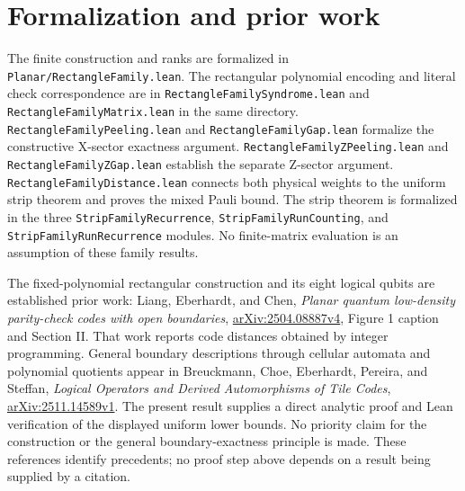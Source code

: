 \documentclass{article}
\begin{document}
\section{Formalization and prior work}\label{sec:prior-work}
\begingroup\sloppy
The finite construction and ranks are formalized in
\texttt{Planar/RectangleFamily.lean}. The rectangular polynomial encoding
and literal check correspondence are in
\texttt{RectangleFamilySyndrome.lean} and
\texttt{RectangleFamilyMatrix.lean} in the same directory.
\texttt{RectangleFamilyPeeling.lean} and
\texttt{RectangleFamilyGap.lean} formalize the constructive X-sector
exactness argument. \texttt{RectangleFamilyZPeeling.lean} and
\texttt{RectangleFamilyZGap.lean} establish the separate Z-sector argument.
\texttt{RectangleFamilyDistance.lean} connects both physical weights to
the uniform strip theorem and proves the mixed Pauli bound.
The strip theorem is formalized in the three
\texttt{StripFamilyRecurrence}, \texttt{StripFamilyRunCounting}, and
\texttt{StripFamilyRunRecurrence} modules. No finite-matrix evaluation is
an assumption of these family results.

The fixed-polynomial rectangular construction and its eight logical qubits
are established prior work: Liang, Eberhardt, and Chen,
\emph{Planar quantum low-density parity-check codes with open boundaries},
\href{https://arxiv.org/html/2504.08887v4}{arXiv:2504.08887v4},
Figure 1 caption and Section II. That work reports code distances obtained
by integer programming. General boundary descriptions through cellular
automata and polynomial quotients appear in Breuckmann, Choe, Eberhardt,
Pereira, and Steffan,
\emph{Logical Operators and Derived Automorphisms of Tile Codes},
\href{https://arxiv.org/html/2511.14589v1}{arXiv:2511.14589v1}.
The present result supplies a direct analytic proof and Lean verification
of the displayed uniform lower bounds. No priority claim for the
construction or the general boundary-exactness principle is made.
These references identify precedents; no proof step above depends on a
result being supplied by a citation.

\endgroup
\end{document}
